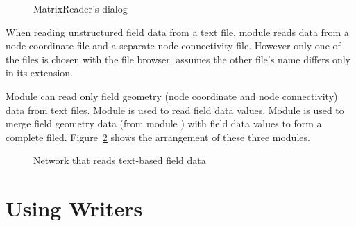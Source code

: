 \begin{figure}[htb]
  \centering
  \begin{makeimage} \end{makeimage}
  \MatrixReaderGUI
  \caption{\label{fig:MatrixReaderGUI} MatrixReader's dialog}
\end{figure}


When reading unstructured field data from a text file, module
 reads data from a node coordinate file and a
separate node connectivity file.  However only one of the files is
chosen with the file browser.   assumes the other
file's name differs only in its extension.

Module  can read only field geometry (node
coordinate and node connectivity) data from text files.  Module
 is used to read field data values.  Module
 is used to merge field geometry data (from
module ) with field data values to form a complete
filed.  Figure~\ref{fig:ReadFieldNet} shows the arrangement of these
three modules.

\begin{figure}[htb]
  \centering
  \begin{makeimage} \end{makeimage}
  \ReadFieldNet
  \caption{\label{fig:ReadFieldNet} Network that reads text-based field data}
\end{figure}

\section{Using Writers}
\label{sec:using_writers}

\newcommand{\FieldWriterGUI}{%
  \includegraphics[0,0][434,483]{Figures/FieldWriterGUI.eps.gz}
}
\begin{htmlonly}
  \newcommand{\FieldWriterGUI}{%
    \htmladdimg[alt="FieldWriter dialog"]{../Figures/FieldWriterGUI.gif}
  }
\end{htmlonly}

\newcommand{\WriteFieldNet}{%
  \includegraphics[0,0][387,224]{Figures/WriteFieldNet.eps.gz}
}
\begin{htmlonly}
  \newcommand{\WriteFieldNet}{%
    \htmladdimg[alt="Network that reads a text-based field"]{../Figures/WriteFieldNet.gif}
  }
\end{htmlonly}

